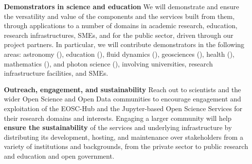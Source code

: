 \begin{compactenum}
\item \label{obj:demonstrators}
  \textbf{Demonstrators in science and education}
  We will demonstrate and ensure the versatility and value of the components and
  the services built from them,
  through applications to a number of
  domains in academic research, education, research infrastructures, SMEs, and for
  the public sector, driven through our project partners. In
  particular, we will contribute demonstrators in the following areas:
  astronomy (), education
  (), fluid dynamics
  (), geosciences
  (), health
  (), mathematics
  (),
  and photon science (),
  involving universities, research infrastructure facilities, and SMEs.

\item \label{obj:outreach-and-engagement}
  \textbf{Outreach, engagement, and sustainability}
  Reach out to scientists and the wider Open Science and Open Data
  communities to encourage engagement
  and exploitation of the EOSC-Hub and the Jupyter-based Open Science
  Services for their research domains and interests.
  Engaging a larger community will help \textbf{ensure the sustainability} of
  the services and underlying infrastructure by distributing its
  development, hosting, and maintenance over stakeholders from a
  variety of institutions and backgrounds,
  from the private sector to public research and education
  and open government.

\end{compactenum}


